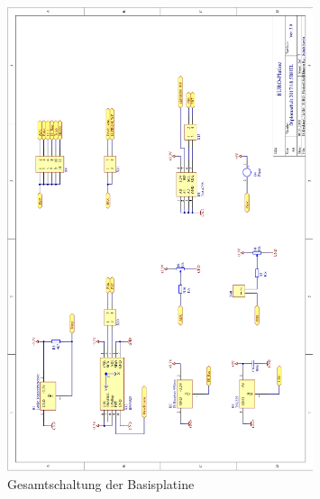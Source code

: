 \begin{figure}[htb]\ContinuedFloat
    \centering
    \includegraphics[width=0.8\textwidth]{Schuh/Pictures/Basis-Schaltung2}
    \caption[Gesamtschaltung der Basisplatine]{Gesamtschaltung der \gls{Basisplatine}}
\end{figure}
